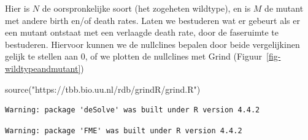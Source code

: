 \documentclass[
  a4paper,
]{scrbook}
\newenvironment{Shaded}{\begin{snugshade}}{\end{snugshade}}
\newcommand{\FunctionTok}[1]{\textcolor[rgb]{0.28,0.35,0.67}{#1}}
\newcommand{\NormalTok}[1]{\textcolor[rgb]{0.00,0.23,0.31}{#1}}
\newcommand{\StringTok}[1]{\textcolor[rgb]{0.13,0.47,0.30}{#1}}
\theoremstyle{definition}
\theoremstyle{remark}
\begin{document}
Hier is \(N\) de oorspronkelijke soort (het zogeheten wildtype), en is
\(M\) de mutant met andere birth en/of death rates. Laten we bestuderen
wat er gebeurt als er een mutant ontstaat met een verlaagde death rate,
door de faseruimte te bestuderen. Hiervoor kunnen we de nullclines
bepalen door beide vergelijkinen gelijk te stellen aan \(0\), of we
plotten de nullclines met Grind (Figuur~\ref{fig-wildtypeandmutant})

\begin{Shaded}
\begin{Highlighting}[]
\FunctionTok{source}\NormalTok{(}\StringTok{"https://tbb.bio.uu.nl/rdb/grindR/grind.R"}\NormalTok{)}
\end{Highlighting}
\end{Shaded}

\begin{verbatim}
Warning: package 'deSolve' was built under R version 4.4.2
\end{verbatim}

\begin{verbatim}
Warning: package 'FME' was built under R version 4.4.2
\end{verbatim}
\end{document}
